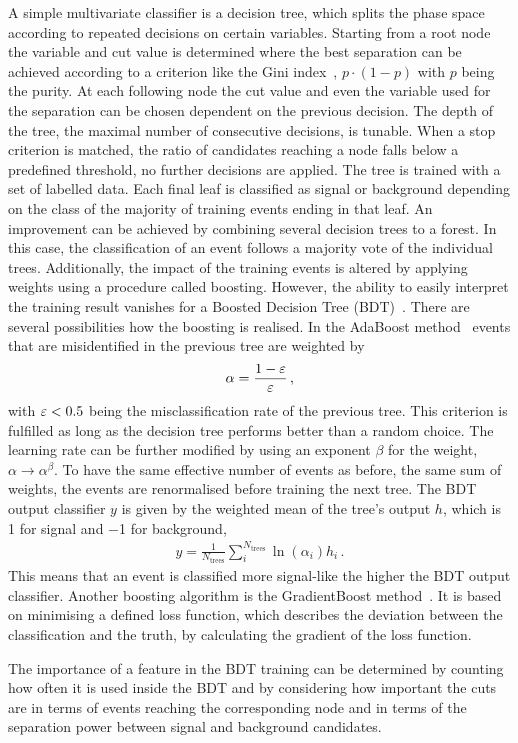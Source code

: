A simple multivariate classifier is a decision tree, which splits the phase
space according to repeated decisions on certain variables. Starting from a
root node the variable and cut value is determined where the best separation
can be achieved according to a criterion like the Gini index~\cite{giniindex},
$p \cdot (1-p)$ with $p$ being the purity. At each following node the cut
value and even the variable used for the separation can be chosen dependent on
the previous decision. The depth of the tree, \ie the maximal number of
consecutive decisions, is tunable. When a stop criterion is matched, \eg the
ratio of candidates reaching a node falls below a predefined threshold, no
further decisions are applied. The tree is trained with a set of labelled
data. Each final leaf is classified as signal or background depending on the
class of the majority of training events ending in that leaf. An improvement
can be achieved by combining several decision trees to a forest. In this case,
the classification of an event follows a majority vote of the individual
trees. Additionally, the impact of the training events is altered by applying
weights using a procedure called boosting. However, the ability to easily
interpret the training result vanishes for a Boosted Decision Tree
(BDT)~\cite{Breiman,Roe}. There are several possibilities how the boosting is
realised. In the AdaBoost method~\cite{AdaBoost} events that are misidentified
in the previous tree are weighted by
\begin{align}
	\alpha = \frac{1 - {\varepsilon}}{{\varepsilon}}\,,
\end{align}
with ${\varepsilon} < \num{0.5}$ being the misclassification rate of the previous tree.
This criterion is fulfilled as long as the decision tree performs better than
a random choice. The learning rate can be further modified by using an
exponent $\beta$ for the weight, $\alpha \to \alpha^{\beta}$. To have the same
effective number of events as before, \ie the same sum of weights, the events
are renormalised before training the next tree. The BDT output classifier $y$
is given by the weighted mean of the tree's output $h$, which is \num{+1} for
signal and \num{-1} for background,
\begin{align}
	y = \frac{1}{N_{\textrm{trees}}} \sum_i^{N_{\textrm{trees}}} \ln(\alpha_i) h_i\,.
\end{align}
This means that an event is classified more signal-like the higher the BDT
output classifier. Another boosting algorithm is the GradientBoost
method~\cite{GradientBoost}. It is based on minimising a defined loss
function, which describes the deviation between the classification and the
truth, by calculating the gradient of the loss function.

The importance of a feature in the BDT training can be determined by counting
how often it is used inside the BDT and by considering how important the cuts
are in terms of events reaching the corresponding node and in terms of the
separation power between signal and background candidates.